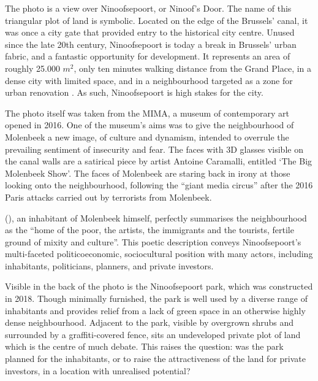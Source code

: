 \documentclass{article}[11pt]
\begin{document}
The photo is a view over Ninoofsepoort, or Ninoof's Door. The name of this triangular plot of land is symbolic. Located on the edge of the Brussels' canal, it was once a city gate that provided entry to the historical city centre. Unused since the late 20th century, Ninoofsepoort is today a break in Brussels' urban fabric, and a fantastic opportunity for development. It represents an area of roughly 25.000 $m^2$, only ten minutes walking distance from the Grand Place, in a dense city with limited space, and in a neighbourhood targeted as a zone for urban renovation \parencite{perspective2020zru}. As such, Ninoofsepoort is high stakes for the city.

The photo itself was taken from the MIMA, a museum of contemporary art opened in 2016. One of the museum's aims was to give the neighbourhood of Molenbeek a new image, of culture and dynamism, intended to overrule the prevailing sentiment of insecurity and fear. The faces with 3D glasses visible on the canal walls are a satirical piece by artist Antoine Caramalli, entitled `The Big Molenbeek Show'. The faces of Molenbeek are staring back in irony at those looking onto the neighbourhood, following the ``giant media circus''\parencite{antoine2016canal} after the 2016 Paris attacks carried out by terrorists from Molenbeek.

\citeauthor{antoine2016canal} (\citeyear{antoine2016canal}), an inhabitant of Molenbeek himself, perfectly summarises the neighbourhood as the ``home of the poor, the artists, the immigrants and the tourists, fertile ground of mixity and culture''.
This poetic description conveys Ninoofsepoort's multi-faceted politicoeconomic, sociocultural position with many actors, including inhabitants, politicians, planners, and private investors.

Visible in the back of the photo is the Ninoofsepoort park, which was constructed in 2018. Though minimally furnished, the park is well used by a diverse range of inhabitants and provides relief from a lack of green space in an otherwise highly dense neighbourhood.
Adjacent to the park, visible by overgrown shrubs and surrounded by a graffiti-covered fence, sits an undeveloped private plot of land which is the centre of much debate. 
 This raises the question: was the park planned for the inhabitants, or to raise the attractiveness of the land for private investors, in a location with unrealised potential?
\end{document}
